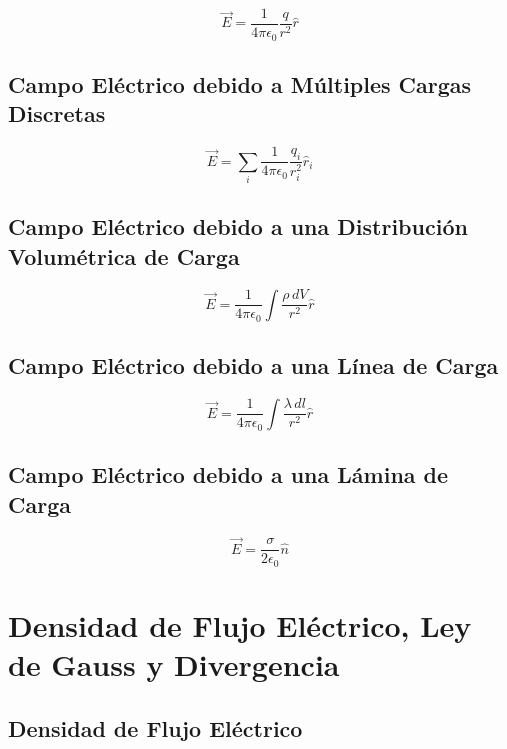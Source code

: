 \documentclass[12pt,a4paper,twocolumn]{article}
\begin{document}
\begin{equation*}
    \vec{E} = \frac{1}{4\pi \epsilon_0} \frac{q}{r^2} \hat{r}
\end{equation*}

\subsection*{Campo Eléctrico debido a Múltiples Cargas Discretas}

\begin{equation*}
    \vec{E} = \sum_i \frac{1}{4\pi \epsilon_0} \frac{q_i}{r_i^2} \hat{r}_i
\end{equation*}

\subsection*{Campo Eléctrico debido a una Distribución Volumétrica de Carga}

\begin{equation*}
    \vec{E} = \frac{1}{4\pi \epsilon_0} \int \frac{\rho \, dV}{r^2} \hat{r}
\end{equation*}

\subsection*{Campo Eléctrico debido a una Línea de Carga}

\begin{equation*}
    \vec{E} = \frac{1}{4\pi \epsilon_0} \int \frac{\lambda \, dl}{r^2} \hat{r}
\end{equation*}

\subsection*{Campo Eléctrico debido a una Lámina de Carga}

\begin{equation*}
    \vec{E} = \frac{\sigma}{2\epsilon_0} \hat{n}
\end{equation*}

\section*{Densidad de Flujo Eléctrico, Ley de Gauss y Divergencia}

\subsection*{Densidad de Flujo Eléctrico}
\end{document}
